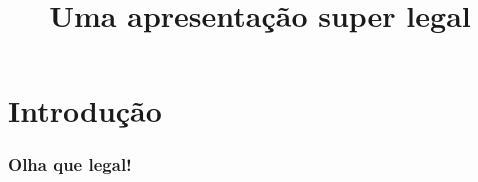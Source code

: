 \documentclass[11pt]{beamer}
\begin{document}
	\title{Uma apresentação super legal}
	\begin{frame}[plain]
		\maketitle
	\end{frame}




\section{Introdução}

\begin{frame}\frametitle{Olha que legal!}


\end{frame}
\end{document}
